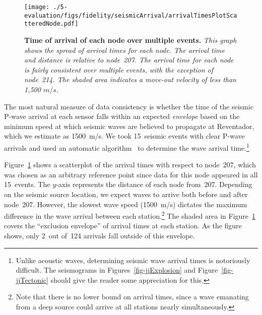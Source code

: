 \begin{figure}[t]
\begin{center}
\texttt{[image: ./5-evaluation/figs/fidelity/seismicArrival/arrivalTimesPlotScatteredNode.pdf]}
\end{center}
\caption{\small{\bf Time of arrival of each node over multiple
events.}  {\em This graph shows the spread of arrival times for each
node.  The arrival time and distance is relative to node~207.  The
arrival time for each node is fairly consistent over multiple events,
with the exception of node~214.  The shaded area indicates a move-out
velocity of less than 1,500 $m/s$.}}
\label{fig-seismicArrivalScatteredNode}
\end{figure}

The most natural measure of data consistency is whether the
time of the seismic P-wave arrival at each sensor falls within 
an expected {\em envelope} based on the minimum speed at which
seismic waves are believed to propagate at Reventador, which 
we estimate as 1500~m/s. We took 15~seismic events with clear
P-wave arrivals and used an automatic algorithm~\cite{pwave-picking} to 
determine the wave arrival time.\footnote{Unlike acoustic
waves, determining seismic wave arrival times is notoriously 
difficult. The seismograms in Figures~\ref{fig-jjExplosion}
and Figure~\ref{fig-jjTectonic} should give the reader some
appreciation for this.} 

Figure~\ref{fig-seismicArrivalScatteredNode} shows a scatterplot of
the arrival times with respect to node~207, which was chosen as an
arbitrary reference point since data for this node appeared in all
15~events. The $y$-axis represents the distance of each node
from~207. Depending on the seismic source location, we expect waves to
arrive both before and after node~207.  However, the slowest wave
speed (1500~m/s) dictates the maximum difference in the wave arrival
between each station.\footnote{Note that there is no lower bound on
arrival times, since a wave emanating from a deep source could arrive
at all stations nearly simultaneously.} The shaded area in
Figure~\ref{fig-seismicArrivalScatteredNode} covers the ``exclusion
envelope'' of arrival times at each station.  As the figure shows,
only 2~out of~124 arrivals fall outside of this envelope.


